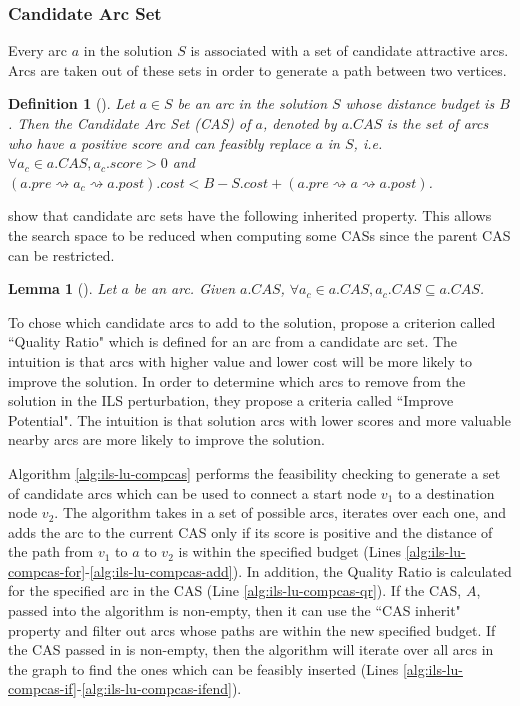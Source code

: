\documentclass[honors]{union-cs-thesis}
\newtheorem{lemma}{Lemma}
\newtheorem{definition}{Definition}
\newcommand{\sse}{\subseteq} %
\newcommand{\spa}{\rightsquigarrow}
\begin{document}
\subsubsection{Candidate Arc Set}
Every arc $a$ in the solution $S$ is associated with a set of candidate attractive arcs. Arcs are taken out of these sets in order to generate a path between two vertices.
%
%
\begin{definition}[\cite{lu2015arc}]
    Let $a \in S$ be an arc in the solution $S$ whose distance budget is $B$. Then the Candidate Arc Set (CAS) of $a$, denoted by $a.CAS$ is the set of arcs who have a positive score and can feasibly replace $a$ in $S$, i.e. $\forall a_c \in a.CAS, a_c.score > 0$ and $(a.pre \spa a_c \spa a.post).cost < B - S.cost + (a.pre \spa a \spa a.post)$.
\end{definition}

\citeauthor{lu2015arc} show that candidate arc sets have the following inherited property. This allows the search space to be reduced when computing some CASs since the parent CAS can be restricted.
\begin{lemma}[\cite{lu2015arc}] Let $a$ be an arc. Given $a.CAS$, $\forall a_c \in a.CAS, a_c.CAS \sse a.CAS$.
\end{lemma}

To chose which candidate arcs to add to the solution, \citeauthor{lu2015arc} propose a criterion called ``Quality Ratio" which is defined for an arc from a candidate arc set. The intuition is that arcs with higher value and lower cost will be more likely to improve the solution. In order to determine which arcs to remove from the solution in the ILS perturbation, they propose a criteria called ``Improve Potential". The intuition is that solution arcs with lower scores and more valuable nearby arcs are more likely to improve the solution.

Algorithm \ref{alg:ils-lu-compcas} performs the feasibility checking to generate a set of candidate arcs which can be used to connect a start node $v_1$ to a destination node $v_2$. The algorithm takes in a set of possible arcs, iterates over each one, and adds the arc to the current CAS only if its score is positive and the distance of the path from $v_1$ to $a$ to $v_2$ is within the specified budget (Lines \ref{alg:ils-lu-compcas-for}-\ref{alg:ils-lu-compcas-add}). In addition, the Quality Ratio is calculated for the specified arc in the CAS (Line \ref{alg:ils-lu-compcas-qr}). If the CAS, $A$, passed into the algorithm is non-empty, then it can use the ``CAS inherit" property and filter out arcs whose paths are within the new specified budget. If the CAS passed in is non-empty, then the algorithm will iterate over all arcs in the graph to find the ones which can be feasibly inserted (Lines \ref{alg:ils-lu-compcas-if}-\ref{alg:ils-lu-compcas-ifend}).
\end{document}
